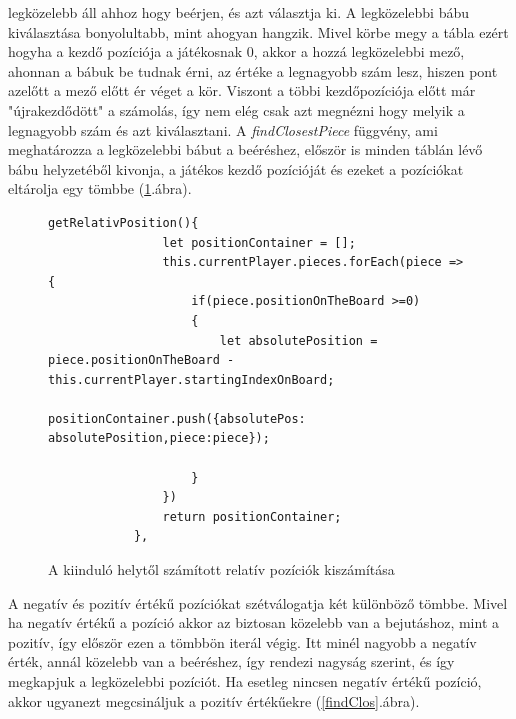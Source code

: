 \documentclass[a4paper,twoside]{article}
\begin{document}
legközelebb áll ahhoz hogy beérjen, és azt választja ki. A legközelebbi bábu kiválasztása bonyolultabb, mint ahogyan hangzik. Mivel körbe megy a tábla ezért hogyha a kezdő pozíciója a játékosnak 0, akkor a hozzá legközelebbi mező, ahonnan a bábuk be tudnak érni, az értéke a legnagyobb szám lesz, hiszen pont azelőtt a mező előtt ér véget a kör. Viszont a többi kezdőpozíciója előtt már "újrakezdődött" a számolás, így nem elég csak azt megnézni hogy melyik a legnagyobb szám és azt kiválasztani. A \textit{findClosestPiece} függvény, ami meghatározza a legközelebbi bábut a beéréshez, először is minden táblán lévő bábu helyzetéből kivonja, a játékos kezdő pozícióját és ezeket a pozíciókat eltárolja egy tömbbe (\ref{absPos}.ábra).
\begin{figure}
	\caption{A kiinduló helytől számított relatív pozíciók kiszámítása}
	\begin{minipage}{\textwidth}
		\begin{lstlisting}[style=javascriptStyle]
			getRelativPosition(){
				let positionContainer = [];
				this.currentPlayer.pieces.forEach(piece => {
					if(piece.positionOnTheBoard >=0)
					{
						let absolutePosition = piece.positionOnTheBoard - this.currentPlayer.startingIndexOnBoard;
						positionContainer.push({absolutePos: absolutePosition,piece:piece});
						
					}
				})
				return positionContainer;
			},
		\end{lstlisting}
	\end{minipage}
	
	\label{absPos}
\end{figure}
\FloatBarrier
 A negatív és pozitív értékű pozíciókat szétválogatja két különböző tömbbe. Mivel ha negatív értékű a pozíció akkor az biztosan közelebb van a bejutáshoz, mint a pozitív, így először ezen a tömbbön iterál végig. Itt minél nagyobb a negatív érték, annál közelebb van a beéréshez, így rendezi nagyság szerint, és így megkapjuk a legközelebbi pozíciót. Ha esetleg nincsen negatív értékű pozíció, akkor ugyanezt megcsináljuk a pozitív értékűekre (\ref{findClos}.ábra). 
\end{document}
